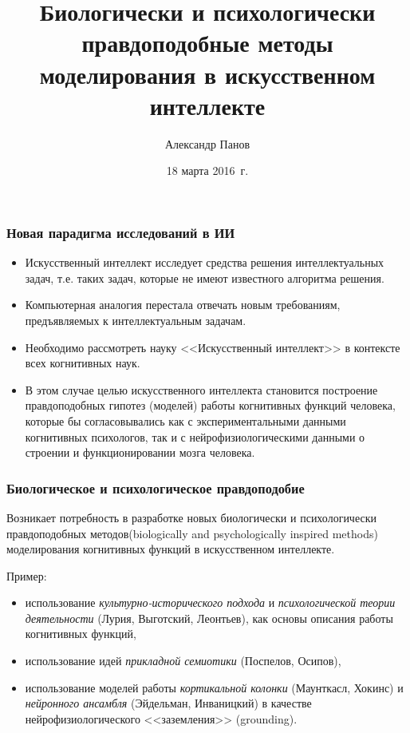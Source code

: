 \documentclass[default]{beamer}
\begin{document}
	
	\title[Bio- and psycho-inspired methods in AI]{Биологически и психологически правдоподобные методы моделирования в искусственном интеллекте}
	\author[Панов]{Александр Панов}
	\date{18 марта 2016~г.} 
	
	\begin{frame}
		\titlepage
	\end{frame}
	
	\begin{frame}
		\frametitle{Новая парадигма исследований в ИИ}
		
		\begin{itemize}
			\item Искусственный интеллект исследует средства решения интеллектуальных задач, т.е. таких задач, которые не имеют известного алгоритма решения.
			\item Компьютерная аналогия перестала отвечать новым требованиям, предъявляемых к интеллектуальным задачам.
			\item Необходимо рассмотреть науку <<Искусственный интеллект>> в контексте всех когнитивных наук.
			\item В этом случае целью искусственного интеллекта становится построение правдоподобных гипотез (моделей) работы когнитивных функций человека, которые бы согласовывались как с экспериментальными данными когнитивных психологов, так и с нейрофизиологическими данными о строении и функционировании мозга человека.
		\end{itemize}
	\end{frame}

	\begin{frame}
		\frametitle{Биологическое и психологическое правдоподобие}
		
		Возникает потребность в разработке новых биологически и психологически правдоподобных методов(biologically and psychologically inspired methods)  моделирования когнитивных функций в искусственном интеллекте.
		\par\bigskip
		Пример:
		\begin{itemize}
			\item использование\textit{ культурно-исторического подхода} и  \textit{психологической теории деятельности} (Лурия, Выготский, Леонтьев), как основы описания работы когнитивных функций,
			\item использование идей\textit{ прикладной семиотики} (Поспелов, Осипов),
			\item использование моделей работы\textit{ кортикальной колонки} (Маунткасл, Хокинс) и \textit{нейронного ансамбля} (Эйдельман, Инваницкий) в качестве нейрофизиологического <<заземления>> (grounding).
		\end{itemize}
	\end{frame}
\end{document}
